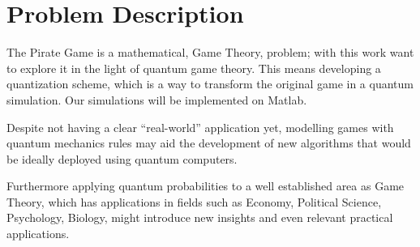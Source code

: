 \section{Problem Description}
\label{sec:int_problem}

The Pirate Game is a mathematical, Game Theory, problem; with this work want to explore it in the light of quantum game theory. This means developing a quantization scheme, which is a way to transform the original game in a quantum simulation. Our simulations will be implemented on Matlab.

Despite not having a clear ``real-world'' application yet, modelling games with quantum mechanics rules may aid the development of new algorithms that would be ideally deployed using quantum computers. 

Furthermore applying quantum probabilities to a well established area as Game Theory, which has applications in fields such as Economy, Political Science, Psychology, Biology, might introduce new insights and even relevant practical applications\cite{Eisert2008}. 



